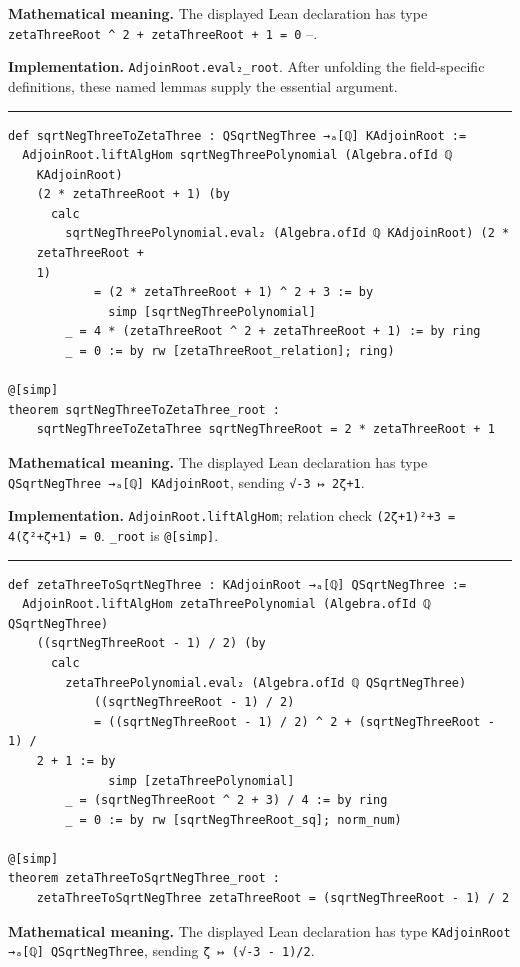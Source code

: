 \documentclass[UTF8,a4paper,11pt,fontset=fandol]{ctexart}
\theoremstyle{definition}
\newcommand{\statementsep}{\par\medskip\hrule\medskip}
\begin{document}
\noindent\textbf{Mathematical meaning.} The displayed Lean declaration has type \texttt{zetaThreeRoot \textasciicircum{} 2 + zetaThreeRoot + 1 = 0} --.\par
\noindent\textbf{Implementation.} \texttt{AdjoinRoot.\allowbreak{}eval₂\_\allowbreak{}root}. After unfolding the field-specific definitions, these named lemmas supply the essential argument.\par
\statementsep
\begin{verbatim}
def sqrtNegThreeToZetaThree : QSqrtNegThree →ₐ[ℚ] KAdjoinRoot :=
  AdjoinRoot.liftAlgHom sqrtNegThreePolynomial (Algebra.ofId ℚ
    KAdjoinRoot)
    (2 * zetaThreeRoot + 1) (by
      calc
        sqrtNegThreePolynomial.eval₂ (Algebra.ofId ℚ KAdjoinRoot) (2 *
    zetaThreeRoot +
    1)
            = (2 * zetaThreeRoot + 1) ^ 2 + 3 := by
              simp [sqrtNegThreePolynomial]
        _ = 4 * (zetaThreeRoot ^ 2 + zetaThreeRoot + 1) := by ring
        _ = 0 := by rw [zetaThreeRoot_relation]; ring)

@[simp]
theorem sqrtNegThreeToZetaThree_root :
    sqrtNegThreeToZetaThree sqrtNegThreeRoot = 2 * zetaThreeRoot + 1
\end{verbatim}
\noindent\textbf{Mathematical meaning.} The displayed Lean declaration has type \texttt{QSqrtNegThree →ₐ[ℚ] KAdjoinRoot}, sending \texttt{√-3 ↦ 2ζ+1}.\par
\noindent\textbf{Implementation.} \texttt{AdjoinRoot.\allowbreak{}liftAlgHom}; relation check \texttt{(2ζ+1)²+3 = 4(ζ²+ζ+1) = 0}. \texttt{\_\allowbreak{}root} is \texttt{@[simp]}.\par
\statementsep
\begin{verbatim}
def zetaThreeToSqrtNegThree : KAdjoinRoot →ₐ[ℚ] QSqrtNegThree :=
  AdjoinRoot.liftAlgHom zetaThreePolynomial (Algebra.ofId ℚ QSqrtNegThree)
    ((sqrtNegThreeRoot - 1) / 2) (by
      calc
        zetaThreePolynomial.eval₂ (Algebra.ofId ℚ QSqrtNegThree)
            ((sqrtNegThreeRoot - 1) / 2)
            = ((sqrtNegThreeRoot - 1) / 2) ^ 2 + (sqrtNegThreeRoot - 1) /
    2 + 1 := by
              simp [zetaThreePolynomial]
        _ = (sqrtNegThreeRoot ^ 2 + 3) / 4 := by ring
        _ = 0 := by rw [sqrtNegThreeRoot_sq]; norm_num)

@[simp]
theorem zetaThreeToSqrtNegThree_root :
    zetaThreeToSqrtNegThree zetaThreeRoot = (sqrtNegThreeRoot - 1) / 2
\end{verbatim}
\noindent\textbf{Mathematical meaning.} The displayed Lean declaration has type \texttt{KAdjoinRoot →ₐ[ℚ] QSqrtNegThree}, sending \texttt{ζ ↦ (√-3 - 1)/\allowbreak{}2}.\par
\end{document}

